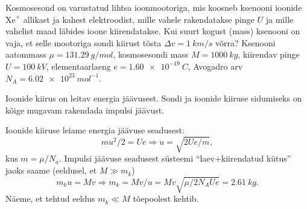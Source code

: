 
Kosmosesond on varustatud lihtsa ioonmootoriga, mis koosneb ksenooni
ioonide $\mathrm{Xe}^+$ allikast ja kahest elektroodist, mille vahele rakendatakse pinge
$U$ ja mille vahelist maad läbides ioone kiirendatakse. Kui suurt kogust
(mass) ksenooni on vaja, et selle mootoriga sondi kiirust tõsta
$\Delta v=\SI{1}{km/s}$ võrra?
%
Ksenooni aatommass $\mu=\SI{131,29}{g/mol}$, kosmosesondi mass $M=\SI{1000}{kg}$, kiirendav pinge
$U=\SI{100}{kV}$, elementaarlaeng $e=\SI{1,60 e-19}{C}$, Avogadro arv
$N_A= \SI{6,02 e23}{mol^{-1}}$.

\hint
Ioonide kiirus on leitav energia jäävusest. Sondi ja ioonide kiiruse sidumiseks on kõige mugavam rakendada impulsi jäävust.

\solu
Ioonide kiiruse leiame energia jäävuse seadusest:
$$mu^2/2=Ue \Rightarrow u=\sqrt{2Ue/m},$$
kus $m=\mu/N_a$.
Impulsi jäävuse seadusest süsteemi \enquote{laev+kiirendatud kütus} jaoks saame (eeldusel, et $M\gg m_k$)
$$m_ku=Mv \Rightarrow m_k=Mv/u=Mv\sqrt{\mu/2N_AUe}=\SI{2,61}{kg}.$$
Näeme, et tehtud eeldus $m_k\ll M$ tõepoolest kehtib.
\probend